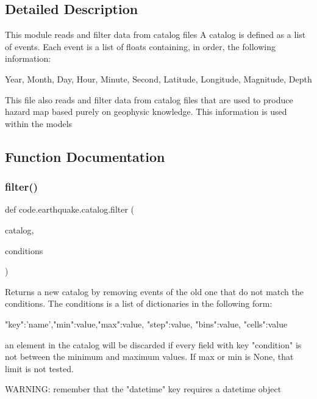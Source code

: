 \subsection{Detailed Description}
\begin{DoxyVerb}This module reads and filter data from catalog files
A catalog is defined as a list of events. Each event is a list
of floats containing, in order, the following information:

Year, Month, Day, Hour, Minute, Second, Latitude, Longitude,
Magnitude, Depth

This file also reads and filter data from catalog files
that are used to produce hazard map based purely on geophysic
knowledge. This information is used within the models
\end{DoxyVerb}
 

\subsection{Function Documentation}
\mbox{\label{namespacecode_1_1earthquake_1_1catalog_aa2c0bb457e5d0aa805231889df01e584}} 
\subsubsection{\texorpdfstring{filter()}{filter()}}
{\footnotesize\ttfamily def code.\+earthquake.\+catalog.\+filter (\begin{DoxyParamCaption}\item[{}]{catalog,  }\item[{}]{conditions }\end{DoxyParamCaption})}

\begin{DoxyVerb}Returns a new catalog by removing events of the old one that do not 
match the conditions. The conditions is a list of dictionaries in 
the following form:

{"key":'name',"min":value,"max":value, "step":value, "bins":value, "cells":value} 

an element in the catalog will be discarded if every field with key "condition" is not 
between the minimum and maximum values. If max or min is None, that limit is not tested.

WARNING: remember that the "datetime" key requires a datetime object
\end{DoxyVerb}
 

